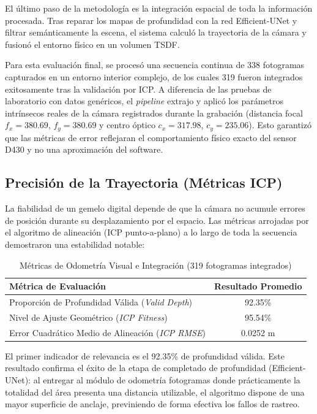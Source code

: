 \documentclass[12pt, a4, twoside, openany]{report}
\begin{document}
El último paso de la metodología es la integración espacial de toda la información procesada. Tras reparar los mapas de profundidad con la red Efficient-UNet y filtrar semánticamente la escena, el sistema calculó la trayectoria de la cámara y fusionó el entorno físico en un volumen TSDF.

Para esta evaluación final, se procesó una secuencia continua de 338 fotogramas capturados en un entorno interior complejo, de los cuales 319 fueron integrados exitosamente tras la validación por ICP. A diferencia de las pruebas de laboratorio con datos genéricos, el \textit{pipeline} extrajo y aplicó los parámetros intrínsecos reales de la cámara registrados durante la grabación (distancia focal $f_x = 380.69$, $f_y = 380.69$ y centro óptico $c_x = 317.98$, $c_y = 235.06$). Esto garantizó que las métricas de error reflejaran el comportamiento físico exacto del sensor D430 y no una aproximación del software.

\subsection{Precisión de la Trayectoria (Métricas ICP)}

La fiabilidad de un gemelo digital depende de que la cámara no acumule errores de posición durante su desplazamiento por el espacio. Las métricas arrojadas por el algoritmo de alineación (ICP punto-a-plano) a lo largo de toda la secuencia demostraron una estabilidad notable:

\begin{table}[H]
\centering
\caption{Métricas de Odometría Visual e Integración (319 fotogramas integrados)}
\label{tab:reconstruction_metrics}
\begin{tabular}{lc}
\toprule
\textbf{Métrica de Evaluación} & \textbf{Resultado Promedio} \\
\midrule
Proporción de Profundidad Válida (\textit{Valid Depth}) & 92.35\% \\
Nivel de Ajuste Geométrico (\textit{ICP Fitness}) & 95.54\% \\
Error Cuadrático Medio de Alineación (\textit{ICP RMSE}) & 0.0252 m \\
\bottomrule
\end{tabular}
\end{table}

El primer indicador de relevancia es el 92.35\% de profundidad válida. Este resultado confirma el éxito de la etapa de completado de profundidad (Efficient-UNet): al entregar al módulo de odometría fotogramas donde prácticamente la totalidad del área presenta una distancia utilizable, el algoritmo dispone de una mayor superficie de anclaje, previniendo de forma efectiva los fallos de rastreo.
\end{document}
